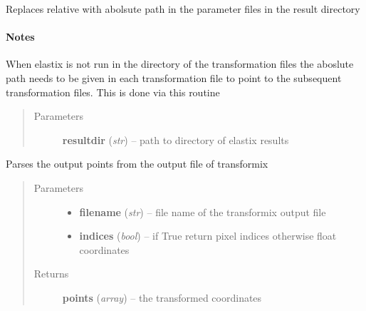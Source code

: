 \documentclass[letterpaper,10pt,english]{sphinxmanual}
\begin{document}
\begin{fulllineitems}
\label{api/ClearMap.Alignment:ClearMap.Alignment.Elastix.setPathTransformParameterFiles}
Replaces relative with abolsute path in the parameter files in the result directory
\paragraph{Notes}

When elastix is not run in the directory of the transformation files
the aboslute path needs to be given in each transformation file
to point to the subsequent transformation files. This is done via this
routine
\begin{quote}\begin{description}
\item[{Parameters}] \leavevmode
\textbf{resultdir} (\emph{str}) --
path to directory of elastix results

\end{description}\end{quote}

\end{fulllineitems}


\begin{fulllineitems}
\label{api/ClearMap.Alignment:ClearMap.Alignment.Elastix.parseElastixOutputPoints}
Parses the output points from the output file of transformix
\begin{quote}\begin{description}
\item[{Parameters}] \leavevmode\begin{itemize}
\item {} 
\textbf{filename} (\emph{str}) --
file name of the transformix output file

\item {} 
\textbf{indices} (\emph{bool}) --
if True return pixel indices otherwise float coordinates

\end{itemize}

\item[{Returns}] \leavevmode
\textbf{points} (\emph{array}) --
the transformed coordinates

\end{description}\end{quote}

\end{fulllineitems}
\end{document}
